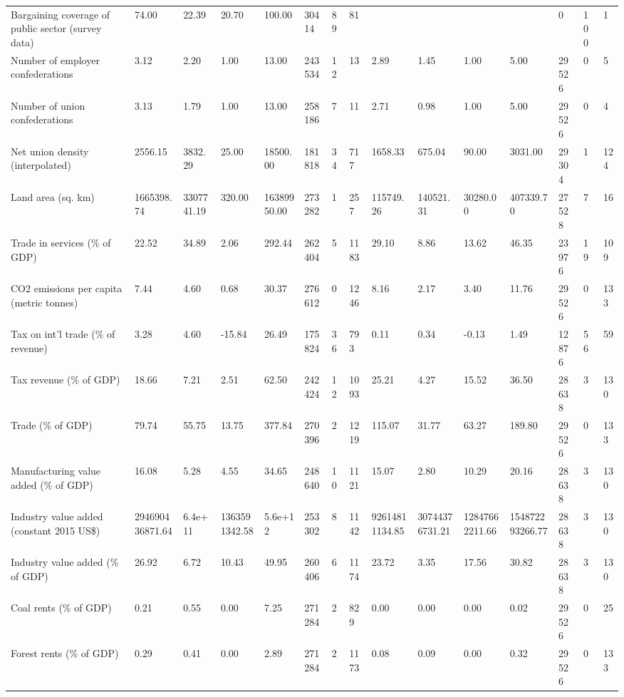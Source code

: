 \begin{longtable}{lllllllllllllll}
\addlinespace
Bargaining coverage of public sector (survey data) & 74.00 & 22.39 & 20.70 & 100.00 & 30414 & 89 & 81 &  &  &  &  & 0 & 100 & 1\\
Number of employer confederations & 3.12 & 2.20 & 1.00 & 13.00 & 243534 & 12 & 13 & 2.89 & 1.45 & 1.00 & 5.00 & 29526 & 0 & 5\\
Number of union confederations & 3.13 & 1.79 & 1.00 & 13.00 & 258186 & 7 & 11 & 2.71 & 0.98 & 1.00 & 5.00 & 29526 & 0 & 4\\
Net union density (interpolated) & 2556.15 & 3832.29 & 25.00 & 18500.00 & 181818 & 34 & 717 & 1658.33 & 675.04 & 90.00 & 3031.00 & 29304 & 1 & 124\\
Land area (sq. km) & 1665398.74 & 3307741.19 & 320.00 & 16389950.00 & 273282 & 1 & 257 & 115749.26 & 140521.31 & 30280.00 & 407339.70 & 27528 & 7 & 16\\
\addlinespace
Trade in services (\% of GDP) & 22.52 & 34.89 & 2.06 & 292.44 & 262404 & 5 & 1183 & 29.10 & 8.86 & 13.62 & 46.35 & 23976 & 19 & 109\\
CO2 emissions per capita (metric tonnes) & 7.44 & 4.60 & 0.68 & 30.37 & 276612 & 0 & 1246 & 8.16 & 2.17 & 3.40 & 11.76 & 29526 & 0 & 133\\
Tax on int'l trade (\% of revenue) & 3.28 & 4.60 & -15.84 & 26.49 & 175824 & 36 & 793 & 0.11 & 0.34 & -0.13 & 1.49 & 12876 & 56 & 59\\
Tax revenue (\% of GDP) & 18.66 & 7.21 & 2.51 & 62.50 & 242424 & 12 & 1093 & 25.21 & 4.27 & 15.52 & 36.50 & 28638 & 3 & 130\\
Trade (\% of GDP) & 79.74 & 55.75 & 13.75 & 377.84 & 270396 & 2 & 1219 & 115.07 & 31.77 & 63.27 & 189.80 & 29526 & 0 & 133\\
\addlinespace
Manufacturing value added (\% of GDP) & 16.08 & 5.28 & 4.55 & 34.65 & 248640 & 10 & 1121 & 15.07 & 2.80 & 10.29 & 20.16 & 28638 & 3 & 130\\
Industry value added (constant 2015 US\$) & 294690436871.64 & 6.4e+11 & 1363591342.58 & 5.6e+12 & 253302 & 8 & 1142 & 92614811134.85 & 30744376731.21 & 12847662211.66 & 154872293266.77 & 28638 & 3 & 130\\
Industry value added (\% of GDP) & 26.92 & 6.72 & 10.43 & 49.95 & 260406 & 6 & 1174 & 23.72 & 3.35 & 17.56 & 30.82 & 28638 & 3 & 130\\
Coal rents (\% of GDP) & 0.21 & 0.55 & 0.00 & 7.25 & 271284 & 2 & 829 & 0.00 & 0.00 & 0.00 & 0.02 & 29526 & 0 & 25\\
Forest rents (\% of GDP) & 0.29 & 0.41 & 0.00 & 2.89 & 271284 & 2 & 1173 & 0.08 & 0.09 & 0.00 & 0.32 & 29526 & 0 & 133\\

\end{longtable}

